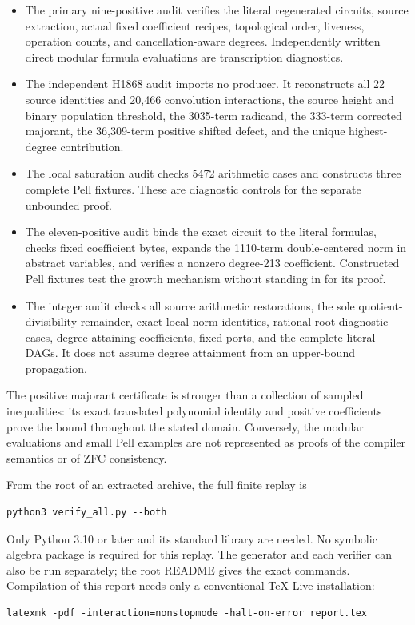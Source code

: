 \documentclass[11pt,a4paper]{article}
\theoremstyle{definition}
\theoremstyle{remark}
\numberwithin{equation}{section}
\begin{document}
\begin{itemize}
 \item The primary nine-positive audit verifies the literal regenerated
 circuits, source extraction, actual fixed coefficient recipes,
 topological order, liveness, operation counts, and cancellation-aware
 degrees. Independently written direct modular formula evaluations are
 transcription diagnostics.
 \item The independent H1868 audit imports no producer. It reconstructs
 all 22 source identities and 20,466 convolution interactions, the
 source height and binary population threshold, the 3035-term radicand,
 the 333-term corrected majorant, the 36,309-term positive shifted
 defect, and the unique highest-degree contribution.
 \item The local saturation audit checks 5472 arithmetic cases and
 constructs three complete Pell fixtures. These are diagnostic
 controls for the separate unbounded proof.
 \item The eleven-positive audit binds the exact circuit to the literal
 formulas, checks fixed coefficient bytes, expands the 1110-term
 double-centered norm in abstract variables, and verifies a nonzero
 degree-213 coefficient. Constructed Pell fixtures test the growth
 mechanism without standing in for its proof.
 \item The integer audit checks all source arithmetic restorations,
 the sole quotient-divisibility remainder, exact local norm identities,
 rational-root diagnostic cases, degree-attaining coefficients, fixed
 ports, and the complete literal DAGs. It does not assume degree
 attainment from an upper-bound propagation.
\end{itemize}

The positive majorant certificate is stronger than a collection of sampled
inequalities: its exact translated polynomial identity and positive
coefficients prove the bound throughout the stated domain. Conversely,
the modular evaluations and small Pell examples are not represented as
proofs of the compiler semantics or of ZFC consistency.

From the root of an extracted archive, the full finite replay is
\begin{verbatim}
python3 verify_all.py --both
\end{verbatim}
Only Python 3.10 or later and its standard library are needed. No symbolic
algebra package is required for this replay. The generator and each
verifier can also be run separately; the root README gives the exact
commands. Compilation of this report needs only a conventional TeX Live
installation:
\begin{verbatim}
latexmk -pdf -interaction=nonstopmode -halt-on-error report.tex
\end{verbatim}
\end{document}
